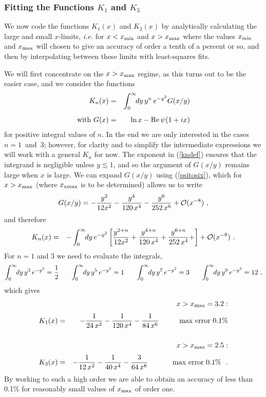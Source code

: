 \documentclass[preprint,12pt,eqsecnum,nofootinbib,amsmath,amssymb]{revtex4}
\begin{document}
\subsubsection{Fitting the Functions $K_1$ and $K_3$}

We now code the functions $K_1(x)$ and $K_2(x)$ by analytically
calculating the large and small $x$-limits, {\em i.e.} for $x 
< x_{\rm min}$ and $x > x_{\rm max}$ where the values $x_{\rm 
min}$ and $x_{\rm max}$ will chosen to give an accuracy of
order a tenth of a percent or so, and then by interpolating 
between these limits with least-squares fits. 

We will first concentrate on the $x > x_{\rm max}$ regime,
as this turns out to be the easier case, and we consider 
the functions
\begin{eqnarray}
\label{kndef}
  K_n(x) &=& \int_0^\infty \!\!dy\, y^n \, e^{-y^2} G(x/y) 
\\[5pt]
\nonumber
  {\rm with}~G(x)&=&\ln x - {\rm Re}\,\psi(1 + i x)
\end{eqnarray}
for positive integral values of $n$. In the end we are only 
interested in the cases \hbox{$n=1$ and $3$}; however, for
clarity and to simplify the intermediate expressions  we will 
work with a general $K_n$ for now. The exponent in (\ref{kndef}) 
ensures that the integrand is negligible unless $y \lesssim 1$, 
and so the argument of $G(x/y)$ remains large when $x$ is large. 
We can expand $G(x/y)$ using (\ref{psitosix}), which for $x > 
x_{\rm max}$ (where $x_{\rm xmax}$ is to be determined) allows 
us to write
\begin{eqnarray}
  G(x/y) = -\frac{y^2}{12 x^2} -
  \frac{y^4}{120\, x^4} - \frac{y^6}{252\, x^6} 
  + {\cal O}(x^{-8}) \ ,
\end{eqnarray}
and therefore 
\begin{eqnarray}
  K_n(x) &=& -\int_0^\infty \!\!dy \, e^{-y^2} 
  \left[ \frac{y^{2+n}}{12 x^2} +
  \frac{y^{4+n}}{120\, x^4}  +   
  \frac{y^{6+n}}{252\, x^4}  + 
  \right] + {\cal O}(x^{-8}) \ .
\end{eqnarray}
For $n=1$ and $3$ we need to evaluate the integrals,
\begin{eqnarray}
  \int_0^\infty \!\!dy \, y^3 \, e^{-y^2} = \frac{1}{2}
  \hskip0.6cm 
  \int_0^\infty \!\!dy \, y^5 \, e^{-y^2} = 1
  \hskip0.6cm 
  \int_0^\infty \!\!dy \, y^7 \, e^{-y^2} = 3
  \hskip0.6cm 
  \int_0^\infty \!\!dy \, y^9 \, e^{-y^2} = 12 \ ,
\end{eqnarray}
which gives 
\begin{eqnarray}
\nonumber
  && \hskip-2cm x > x_{\rm max}=3.2 :
\\[3pt]
  K_1(x) &=& -\frac{1}{24\, x^2} -\frac{1}{120\, x^4}
  - \frac{1}{84\, x^6}
 \hskip1cm {\rm max~error}~ 0.1\%
\\[15pt]
\nonumber
  && \hskip-2cm x > x_{\rm max}=2.5 :
\\[3pt]
  K_3(x) &=& -\frac{1}{12\, x^2} -\frac{1}{40\, x^4}
  - \frac{3}{64\, x^6}
 \hskip1.2cm {\rm max~error}~ 0.1\% ~~ .
\end{eqnarray}
By working to such a high order we are able to obtain
an accuracy of less than 0.1\% for reasonably small
values of $x_{\rm max}$ of order one. 
\end{document}
